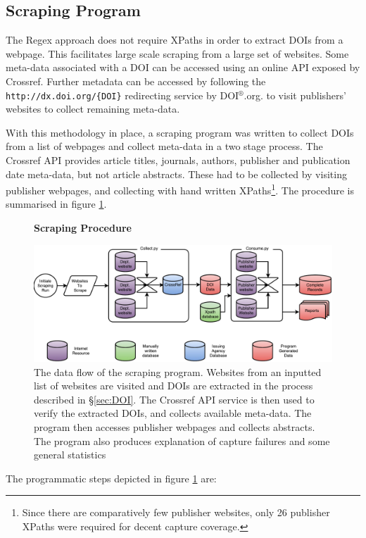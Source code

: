 \subsection{Scraping Program}
\label{sec:SCRAPING_PROGRAM}
The Regex approach does not require XPaths in order to extract DOIs from a webpage. This facilitates large scale scraping from a large set of websites. Some meta-data associated with a DOI can be accessed using an online API exposed by Crossref. Further metadata can be accessed by following the \texttt{http://dx.doi.org/\{DOI\}} redirecting service by DOI$^{\circledR}$.org. to visit publishers' websites to collect remaining meta-data. 

With this methodology in place, a scraping program was written to collect DOIs from a list of webpages and collect meta-data in a two stage process. The Crossref API provides article titles, journals, authors, publisher and publication date meta-data, but not article abstracts. These had to be collected by visiting publisher webpages, and collecting with hand written XPaths\footnote{Since there are comparatively few publisher websites, only 26 publisher XPaths were required for decent capture coverage.}. The procedure is summarised in figure \ref{fig:Cherry}.
\begin{figure}[H]
    \centering
    \textbf{Scraping Procedure}\par\medskip
    \includegraphics[width=\textwidth]{Data_Acquisition/Cherry2.pdf}
    \caption[Data Flow in Scraping Procedure]{The data flow of the scraping program. Websites from an inputted list of websites are visited and DOIs are extracted in the process described in  \S\ref{sec:DOI}. The Crossref API service is then used to verify the extracted DOIs, and collects available meta-data. The program then accesses publisher webpages and collects abstracts. The program also produces explanation of capture failures and some general statistics}
\label{fig:Cherry}
\end{figure}
The programmatic steps depicted in figure \ref{fig:Cherry} are:
